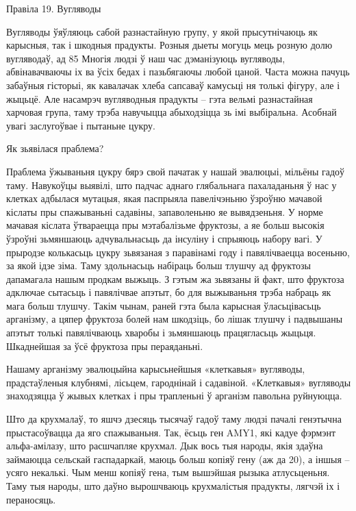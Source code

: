 Правіла 19. Вугляводы

Вугляводы ўяўляюць сабой разнастайную групу, у якой прысутнічаюць як карысныя, так і шкодныя прадукты. Розныя дыеты могуць мець розную долю вугляводаў, ад 85%
Многія людзі ў наш час дэманізуюць вугляводы, абвінавачваючы іх ва ўсіх бедах і пазьбягаючы любой цаной. Часта можна пачуць забаўныя гісторыі, як кавалачак хлеба сапсаваў камусьці ня толькі фігуру, але і жыцьцё. Але насамрэч вугляводныя прадукты – гэта вельмі разнастайная харчовая група, таму трэба навучыцца абыходзіцца зь імі выбіральна. Асобнай увагі заслугоўвае і пытаньне цукру.

Як зьявілася праблема?

Праблема ўжываньня цукру бярэ свой пачатак у нашай эвалюцыі, мільёны гадоў таму. Навукоўцы выявілі, што падчас аднаго глябальнага пахаладаньня ў нас у клетках адбылася мутацыя, якая паспрыяла павелічэньню ўзроўню мачавой кіслаты пры спажываньні садавіны, запаволеньню яе вывядзеньня. У норме мачавая кіслата ўтвараецца пры мэтабалізьме фруктозы, а яе больш высокія ўзроўні зьмяншаюць адчувальнасьць да інсуліну і спрыяюць набору вагі.
У прыродзе колькасьць цукру зьвязаная з паравінамі году і павялічваецца восеньню, за якой ідзе зіма. Таму здольнасьць набіраць больш тлушчу ад фруктозы дапамагала нашым продкам выжыць. З гэтым жа зьвязаны й факт, што фруктоза адключае сытасьць і павялічвае апэтыт, бо для выжываньня трэба набраць як мага больш тлушчу. Такім чынам, раней гэта была карысная ўласьцівасьць арганізму, а цяпер фруктоза болей нам шкодзіць, бо лішак тлушчу і падвышаны апэтыт толькі павялічваюць хваробы і зьмяншаюць працягласьць жыцьця. Шкаднейшая за ўсё фруктоза пры пераяданьні.

Нашаму арганізму эвалюцыйна карысьнейшыя «клеткавыя» вугляводы, прадстаўленыя клубнямі, лісьцем, гароднінай і садавіной. «Клеткавыя» вугляводы знаходзяцца ў жывых клетках і пры трапленьні ў арганізм павольна руйнуюцца.

Што да крухмалаў, то яшчэ дзесяць тысячаў гадоў таму людзі пачалі генэтычна прыстасоўвацца да яго спажываньня. Так, ёсьць ген AMY1, які кадуе фэрмэнт альфа-амілазу, што расшчапляе крухмал. Дык вось тыя народы, якія здаўна займаюцца сельскай гаспадаркай, маюць больш копіяў гену (аж да 20), а іншыя – усяго некалькі. Чым менш копіяў гена, тым вышэйшая рызыка атлусьценьня. Таму тыя народы, што даўно вырошчваюць крухмалістыя прадукты, лягчэй іх і пераносяць.

